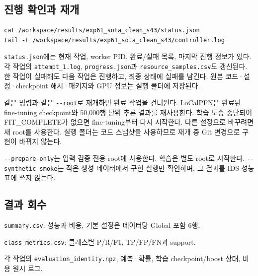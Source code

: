 \subsection{진행 확인과 재개}

\begin{Verbatim}[breaklines=true,breakanywhere=true,fontsize=\scriptsize]
cat /workspace/results/exp61_sota_clean_s43/status.json
tail -F /workspace/results/exp61_sota_clean_s43/controller.log

\end{Verbatim}
\texttt{status.\allowbreak{}j\allowbreak{}son}에는 현재 작업, worker PID, 완료/\allowbreak{}실패 목록, 마지막 진행 정보가 있다. 각 작업의 \texttt{attempt\_\allowbreak{}\allowbreak{}1.\allowbreak{}log}, \texttt{progress\allowbreak{}.\allowbreak{}json}과 \texttt{resource\allowbreak{}\_\allowbreak{}\allowbreak{}samples\allowbreak{}.\allowbreak{}csv}도 갱신된다. 한 작업이 실패해도 다음 작업은 진행하고, 최종 상태에 실패를 남긴다. 원본 코드·설정·checkpoint 해시·패키지와 GPU 정보는 실행 폴더에 저장된다.

같은 명령과 같은 \texttt{-\allowbreak{}-\allowbreak{}root}로 재개하면 완료 작업을 건너뛴다. LoCalPFN은 완료된 fine-tuning checkpoint와 50,000행 단위 추론 결과를 재사용한다. 학습 도중 중단되어 FIT\_\allowbreak{}COMPLETE가 없으면 fine-tuning부터 다시 시작한다. 다른 설정으로 바꾸려면 새 root를 사용한다. 실행 폴더는 코드 스냅샷을 사용하므로 재개 중 Git 변경으로 구현이 바뀌지 않는다.

\texttt{-\allowbreak{}-\allowbreak{}prepar\allowbreak{}e-\allowbreak{}only}는 입력 검증 전용 root에 사용한다. 학습은 별도 root로 시작한다. \texttt{-\allowbreak{}-\allowbreak{}synthe\allowbreak{}tic-\allowbreak{}smok\allowbreak{}e}는 작은 생성 데이터에서 구현 실행만 확인하며, 그 결과를 IDS 성능표에 쓰지 않는다.

\subsection{결과 회수}
\par\noindent \textbullet\enspace \texttt{summary.\allowbreak{}csv}: 성능과 비용, 기본 설정은 데이터당 Global 포함 6행.


\par\noindent \textbullet\enspace \texttt{class\_\allowbreak{}\allowbreak{}me\allowbreak{}trics.\allowbreak{}cs\allowbreak{}v}: 클래스별 P/\allowbreak{}R/\allowbreak{}F1, TP/\allowbreak{}FP/\allowbreak{}FN과 support.


\par\noindent \textbullet\enspace 각 작업의 \texttt{evaluati\allowbreak{}on\_\allowbreak{}\allowbreak{}ident\allowbreak{}ity.\allowbreak{}npz}, 예측·확률, 학습 checkpoint/\allowbreak{}boost 상태, 비용 원시 로그.


